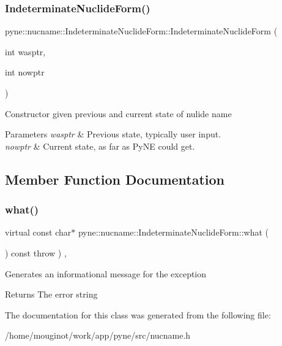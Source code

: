 \subsubsection{\texorpdfstring{Indeterminate\+Nuclide\+Form()}{IndeterminateNuclideForm()}\hspace{0.1cm}{\footnotesize\ttfamily [4/4]}}
{\footnotesize\ttfamily pyne\+::nucname\+::\+Indeterminate\+Nuclide\+Form\+::\+Indeterminate\+Nuclide\+Form (\begin{DoxyParamCaption}\item[{int}]{wasptr,  }\item[{int}]{nowptr }\end{DoxyParamCaption})\hspace{0.3cm}{\ttfamily [inline]}}

Constructor given previous and current state of nulide name 
\begin{DoxyParams}{Parameters}
{\em wasptr} & Previous state, typically user input. \\
\hline
{\em nowptr} & Current state, as far as Py\+NE could get. \\
\hline
\end{DoxyParams}


\subsection{Member Function Documentation}
\mbox{\label{classpyne_1_1nucname_1_1_indeterminate_nuclide_form_a28a16b4bf2b6ba6184758f8f469fb90b}} 
\subsubsection{\texorpdfstring{what()}{what()}}
{\footnotesize\ttfamily virtual const char$\ast$ pyne\+::nucname\+::\+Indeterminate\+Nuclide\+Form\+::what (\begin{DoxyParamCaption}{ }\end{DoxyParamCaption}) const throw  ) \hspace{0.3cm}{\ttfamily [inline]}, {\ttfamily [virtual]}}

Generates an informational message for the exception \begin{DoxyReturn}{Returns}
The error string 
\end{DoxyReturn}


The documentation for this class was generated from the following file\+:\begin{DoxyCompactItemize}
\item 
/home/mouginot/work/app/pyne/src/nucname.\+h\end{DoxyCompactItemize}
